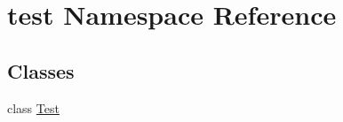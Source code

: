 \hypertarget{namespacetest}{}\section{test Namespace Reference}
\label{namespacetest}
\subsection*{Classes}
\begin{DoxyCompactItemize}
\item 
class \hyperlink{classtest_1_1_test}{Test}
\end{DoxyCompactItemize}

